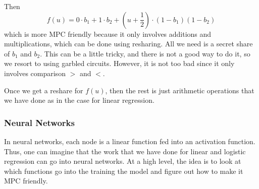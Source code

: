 Then $$f(u) = 0 \cdot b_1 + 1 \cdot b_2 + (u + \frac{1}{2})\cdot (1-b_1)(1-b_2)$$
which is more MPC friendly because it only involves additions and multiplications, which can be done using resharing. All we need is a secret share of $b_1$ and $b_2$. This can be a little tricky, and there is not a good way to do it, so we resort to using garbled circuits. However, it is not too bad since it only involves comparison $>$ and $<$.

Once we get a reshare for $f(u)$, then the rest is just arithmetic operations that we have done as in the case for linear regression.

\subsubsection{Neural Networks}

In neural networks, each node is a linear function fed into an activation function. Thus, one can imagine that the work that we have done for linear and logistic regression can go into neural networks. At a high level, the idea is to look at which functions go into the training the model and figure out how to make it MPC friendly.